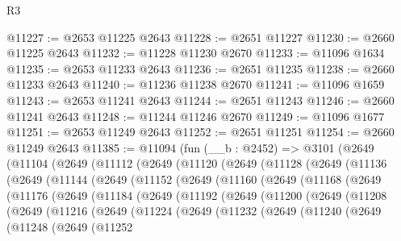\begin{lexlean}{R3}
\begin{coremodule}
@11227 := @2653 @11225 @2643
@11228 := @2651 @11227
@11230 := @2660 @11225 @2643
@11232 := @11228 @11230 @2670
@11233 := @11096 @1634
@11235 := @2653 @11233 @2643
@11236 := @2651 @11235
@11238 := @2660 @11233 @2643
@11240 := @11236 @11238 @2670
@11241 := @11096 @1659
@11243 := @2653 @11241 @2643
@11244 := @2651 @11243
@11246 := @2660 @11241 @2643
@11248 := @11244 @11246 @2670
@11249 := @11096 @1677
@11251 := @2653 @11249 @2643
@11252 := @2651 @11251
@11254 := @2660 @11249 @2643
@11385 := @11094
    (fun (__b : @2452) =>
    @3101
      (@2649
        (@11104
          (@2649
            (@11112
              (@2649
                (@11120
                  (@2649
                    (@11128
                      (@2649
                        (@11136
                          (@2649
                            (@11144
                              (@2649
                                (@11152
                                  (@2649
                                    (@11160
                                      (@2649
                                        (@11168
                                          (@2649
                                            (@11176
                                              (@2649
                                                (@11184
                                                  (@2649
                                                    (@11192
                                                      (@2649
                                                        (@11200
                                                          (@2649
                                                            (@11208
                                                              (@2649
                                                                (@11216
                                                                  (@2649
                                                                    (@11224
                                                                      (@2649
                                                                        (@11232
                                                                          (@2649
                                                                            (@11240
                                                                              (@2649
                                                                                (@11248
                                                                                  (@2649
                                                                                    (@11252

\end{coremodule}
\end{lexlean}
